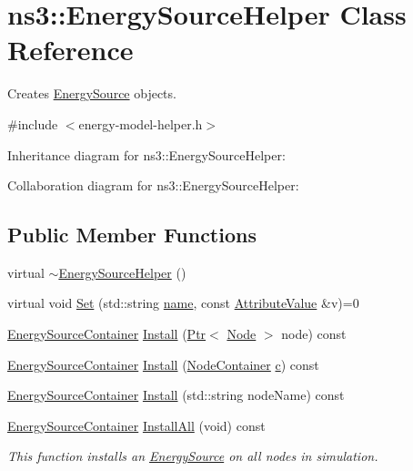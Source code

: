 \hypertarget{classns3_1_1EnergySourceHelper}{}\section{ns3\+:\+:Energy\+Source\+Helper Class Reference}
\label{classns3_1_1EnergySourceHelper}


Creates \hyperlink{classns3_1_1EnergySource}{Energy\+Source} objects.  




{\ttfamily \#include $<$energy-\/model-\/helper.\+h$>$}



Inheritance diagram for ns3\+:\+:Energy\+Source\+Helper\+:


Collaboration diagram for ns3\+:\+:Energy\+Source\+Helper\+:
\subsection*{Public Member Functions}
\begin{DoxyCompactItemize}
\item 
virtual \hyperlink{classns3_1_1EnergySourceHelper_a1f040d9c091a33a08ce475c589833010}{$\sim$\+Energy\+Source\+Helper} ()
\item 
virtual void \hyperlink{classns3_1_1EnergySourceHelper_ace926f92f679fac7fe7188c9c144ef4a}{Set} (std\+::string \hyperlink{generate__test__data__lte__spectrum__model_8m_ab74e6bf80237ddc4109968cedc58c151}{name}, const \hyperlink{classns3_1_1AttributeValue}{Attribute\+Value} \&v)=0
\item 
\hyperlink{classns3_1_1EnergySourceContainer}{Energy\+Source\+Container} \hyperlink{classns3_1_1EnergySourceHelper_ac52e48ef79c83537cc0bba02df8d91a1}{Install} (\hyperlink{classns3_1_1Ptr}{Ptr}$<$ \hyperlink{classns3_1_1Node}{Node} $>$ node) const 
\item 
\hyperlink{classns3_1_1EnergySourceContainer}{Energy\+Source\+Container} \hyperlink{classns3_1_1EnergySourceHelper_a68818ee5bdc399fcf9023757355688a6}{Install} (\hyperlink{classns3_1_1NodeContainer}{Node\+Container} \hyperlink{mmwave_2model_2fading-traces_2fading__trace__generator_8m_ae0323a9039add2978bf5b49550572c7c}{c}) const 
\item 
\hyperlink{classns3_1_1EnergySourceContainer}{Energy\+Source\+Container} \hyperlink{classns3_1_1EnergySourceHelper_a9541de9458427965e5768212a8d53f0c}{Install} (std\+::string node\+Name) const 
\item 
\hyperlink{classns3_1_1EnergySourceContainer}{Energy\+Source\+Container} \hyperlink{classns3_1_1EnergySourceHelper_a82c18d8bec536e421f25df64cd89a4b1}{Install\+All} (void) const 
\begin{DoxyCompactList}\small\item\em This function installs an \hyperlink{classns3_1_1EnergySource}{Energy\+Source} on all nodes in simulation. \end{DoxyCompactList}\end{DoxyCompactItemize}
